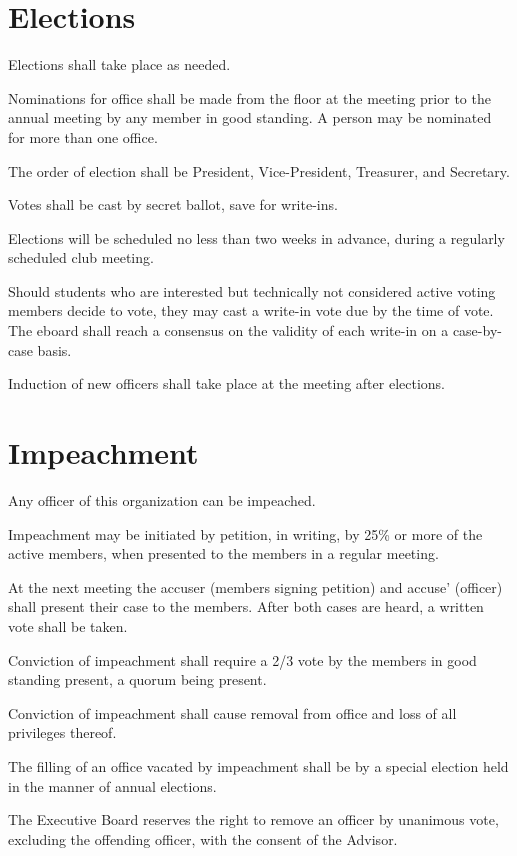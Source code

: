 \section{Elections}
\begin{subroutines}
\item Elections shall take place as needed.
\item Nominations for office shall be made from the floor at the meeting prior to the annual meeting by any member in good standing. A person may be
nominated for more than one office.
\item The order of election shall be President, Vice-President, Treasurer, and Secretary.
\item Votes shall be cast by secret ballot, save for write-ins.
\item Elections will be scheduled no less than two weeks in advance, during a regularly scheduled club meeting.
\item Should students who are interested but technically not considered active voting members decide to vote, they may cast a write-in vote due by the time of vote. The eboard shall reach a consensus on the validity of each write-in on a case-by-case basis.
\item Induction of new officers shall take place at the meeting after elections.
\end{subroutines}

\section{Impeachment}
\begin{subroutines}
\item Any officer of this organization can be impeached.
\item Impeachment may be initiated by petition, in writing, by 25\% or more of the active members, when presented to the members in a regular meeting.
\item At the next meeting the accuser (members signing petition) and accuse’ (officer) shall present their case to the members.  After both cases are heard, a written vote shall be taken.
\item Conviction of impeachment shall require a 2/3 vote by the members in good standing present, a quorum being present.
\item Conviction of impeachment shall cause removal from office and loss of all privileges thereof.
\item The filling of an office vacated by impeachment shall be by a special election held in the manner of annual elections.
\item The Executive Board reserves the right to remove an officer by unanimous vote, excluding the offending officer, with the consent of the Advisor.
\end{subroutines}

